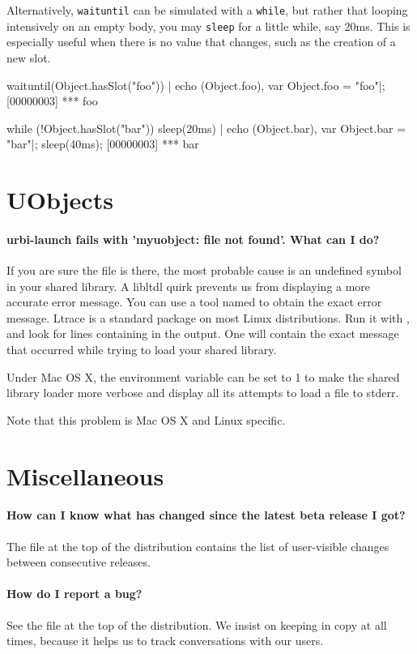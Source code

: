 Alternatively, \lstinline|waituntil| can be simulated with a
\lstinline|while|, but rather that looping intensively on an empty
body, you may \lstinline|sleep| for a little while, say 20ms.  This is
especially useful when there is no value that changes, such as the
creation of a new slot.

\begin{urbiscript}[firstnumber=last]
waituntil(Object.hasSlot("foo")) | echo (Object.foo),
var Object.foo = "foo"|;
[00000003] *** foo
\end{urbiscript}

\begin{urbiscript}[firstnumber=last]
while (!Object.hasSlot("bar"))
  sleep(20ms) |
echo (Object.bar),
var Object.bar = "bar"|;
sleep(40ms);
[00000003] *** bar
\end{urbiscript}

\section{UObjects}

\paragraph{urbi-launch fails with 'myuobject: file not found'. What can I do?}
If you are sure the file is there, the most probable cause is an
undefined symbol in your shared library. A libltdl quirk prevents us
from displaying a more accurate error message.  You can use a tool
named  to obtain the exact error message.  Ltrace is a
standard package on most Linux distributions.  Run it with
, and look for lines
containing  in the output. One will contain the exact
message that occurred while trying to load your shared library.

Under Mac OS X, the  environment variable can
be set to 1 to make the shared library loader more verbose and display
all its attempts to load a file to stderr.

Note that this problem is Mac OS X and Linux specific.

\section{Miscellaneous}
\paragraph{How can I know what has changed since the latest beta release I got?}
The file  at the top of the distribution
contains the list of user-visible changes between consecutive
releases.

\paragraph{How do I report a bug?}
See the file  at the top of the
distribution. We insist on keeping  in
copy at all times, because it helps us to track conversations with our
users.


